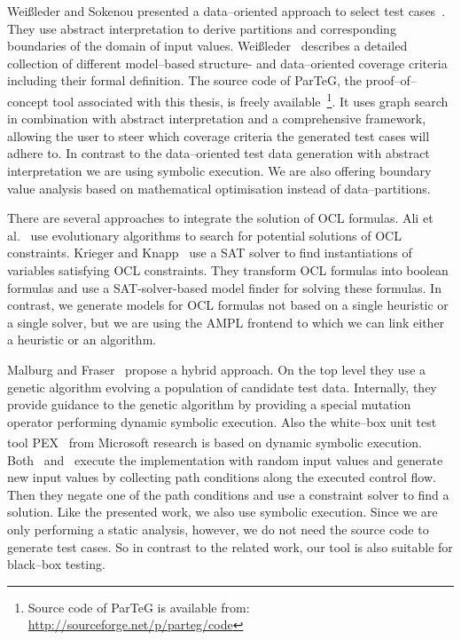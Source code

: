 \documentclass[runningheads,a4paper]{llncs}%
\begin{document}
Wei{\ss}leder and Sokenou presented a data--oriented approach to select test
cases~\cite{weissleder2008automatic}. They use abstract interpretation to derive
partitions and corresponding boundaries of the domain of input values.
Wei{\ss}leder~\cite{ParTeG} describes a detailed collection of different
model--based structure- and data--oriented coverage criteria including their
formal definition.
The source code of ParTeG, the proof--of--concept tool associated with this
thesis, is freely available~\footnote{Source code of ParTeG is available from: \href{http://sourceforge.net/p/parteg/code}{http://sourceforge.net/p/parteg/code}}. It uses graph search in
combination with abstract interpretation and a comprehensive framework, allowing
the user to steer which coverage criteria the generated test cases will adhere
to. In contrast to the data--oriented test data generation with abstract
interpretation we are using symbolic execution. We are also offering boundary
value analysis based on mathematical optimisation instead of data--partitions.

There are several approaches to integrate the solution of OCL formulas. Ali et
al.~\cite{ali2011search} use evolutionary algorithms to search for potential
solutions of OCL constraints. Krieger and
Knapp~\cite{krieger2008executingUnderspecifiedOCL} use a SAT solver to find
instantiations of variables satisfying OCL constraints. They transform OCL
formulas into boolean formulas and use a SAT-solver-based model finder for
solving these formulas. In contrast, we generate models for OCL formulas not
based on a single heuristic or a single solver, but we are using the AMPL
frontend to which we can link either a heuristic or an algorithm.

Malburg and Fraser~\cite{malburg2011combining} propose a hybrid approach. On the
top level they use a genetic algorithm evolving a population of candidate test
data. Internally, they provide guidance to the genetic algorithm by providing a
special mutation operator performing dynamic symbolic execution. Also the
white--box unit test tool PEX~\cite{pex} from
Microsoft\textsuperscript{\textregistered} research is based on dynamic symbolic
execution. Both~\cite{malburg2011combining} and~\cite{pex} execute the
implementation with random input values and generate new input values by
collecting path conditions along the executed control flow. Then they negate one
of the path conditions and use a constraint solver to find a solution. Like the
presented work, we also use symbolic execution. Since we are only performing a
static analysis, however, we do not need the source code to generate test cases.
So in contrast to the related work, our tool is also suitable for black--box
testing.
%
\end{document}
